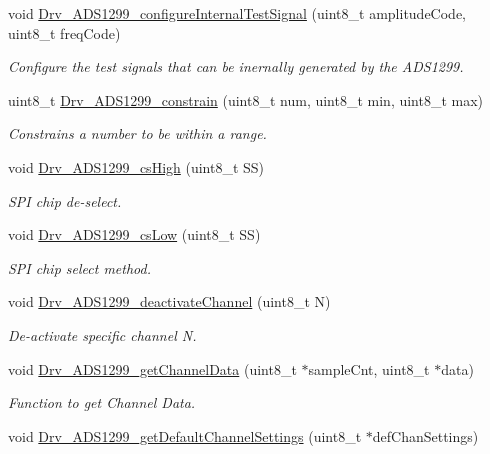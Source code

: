 \begin{DoxyCompactItemize}
void \hyperlink{group__ADS1299__Library_gab82c3d9732f1cf5d5fc8017cd807f035}{Drv\+\_\+\+A\+D\+S1299\+\_\+configure\+Internal\+Test\+Signal} (uint8\+\_\+t amplitude\+Code, uint8\+\_\+t freq\+Code)
\begin{DoxyCompactList}\small\item\em Configure the test signals that can be inernally generated by the A\+D\+S1299. \end{DoxyCompactList}\item 
uint8\+\_\+t \hyperlink{group__ADS1299__Library_ga713b706931292d92d4e8972d79a311a0}{Drv\+\_\+\+A\+D\+S1299\+\_\+constrain} (uint8\+\_\+t num, uint8\+\_\+t min, uint8\+\_\+t max)
\begin{DoxyCompactList}\small\item\em Constrains a number to be within a range. \end{DoxyCompactList}\item 
void \hyperlink{group__ADS1299__Library_gad90e09cf6259d704d03a6b3f569d0976}{Drv\+\_\+\+A\+D\+S1299\+\_\+cs\+High} (uint8\+\_\+t SS)
\begin{DoxyCompactList}\small\item\em S\+PI chip de-\/select. \end{DoxyCompactList}\item 
void \hyperlink{group__ADS1299__Library_gae7bfe7b22c142ad6af3606fc094dd149}{Drv\+\_\+\+A\+D\+S1299\+\_\+cs\+Low} (uint8\+\_\+t SS)
\begin{DoxyCompactList}\small\item\em S\+PI chip select method. \end{DoxyCompactList}\item 
void \hyperlink{group__ADS1299__Library_gaf752ff51f24643ab51099720f9d69846}{Drv\+\_\+\+A\+D\+S1299\+\_\+deactivate\+Channel} (uint8\+\_\+t N)
\begin{DoxyCompactList}\small\item\em De-\/activate specific channel N. \end{DoxyCompactList}\item 
void \hyperlink{group__ADS1299__Library_ga7b9304053ccfe17319cc73d1c5c738c1}{Drv\+\_\+\+A\+D\+S1299\+\_\+get\+Channel\+Data} (uint8\+\_\+t $\ast$sample\+Cnt, uint8\+\_\+t $\ast$data)
\begin{DoxyCompactList}\small\item\em Function to get Channel Data. \end{DoxyCompactList}\item 
void \hyperlink{group__ADS1299__Library_ga4562e58d7948065c637e9289b4e942ef}{Drv\+\_\+\+A\+D\+S1299\+\_\+get\+Default\+Channel\+Settings} (uint8\+\_\+t $\ast$def\+Chan\+Settings)

\end{DoxyCompactItemize}

